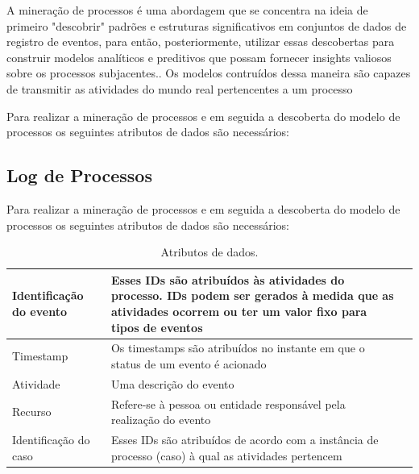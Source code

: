 \documentclass[tcc2]{classe_uftex/uftex}
\begin{document}
\begin{enumerate}
          A mineração de processos é uma abordagem que se concentra na ideia de primeiro "descobrir" padrões e estruturas significativos em conjuntos de dados de registro de eventos, para então, posteriormente, utilizar essas descobertas para construir modelos analíticos e preditivos que possam fornecer insights valiosos sobre os processos subjacentes.\cite{greyling2017application}. Os modelos contruídos dessa maneira são capazes de transmitir as atividades do mundo real pertencentes a um processo

          Para realizar a mineração de processos e em seguida a descoberta do modelo de processos os seguintes atributos de dados são necessários: 




\end{enumerate}



\subsection{Log de Processos}

Para realizar a mineração de processos e em seguida a descoberta do modelo de processos os seguintes atributos de dados\cite{greyling2017application} são necessários:  

\vspace{1cm}


\begin{table}[ht]
\centering
\begin{tabularx}{0.8\textwidth} { 
  | >{\raggedright\arraybackslash}X 
  | >{\centering\arraybackslash}X 
  | >{\raggedleft\arraybackslash}X | }
 \hline
 Identificação do evento & Esses IDs são atribuídos às atividades do processo. IDs podem ser gerados à medida que as atividades ocorrem ou ter um valor fixo para tipos de eventos  \\
 \hline
 Timestamp  & Os timestamps são atribuídos no instante em que o status de um evento é acionado    \\
\hline
 Atividade  & Uma descrição do evento    \\
\hline
Recurso  & Refere-se à pessoa ou entidade responsável pela realização do evento   \\
\hline
Identificação do caso  & Esses IDs são atribuídos de acordo com a instância de processo (caso) à qual as atividades pertencem   \\
\hline
\end{tabularx}
\caption{Atributos de dados.\cite{greyling2017application}}
\label{tab:minhatabela}
\end{table}
\end{document}

